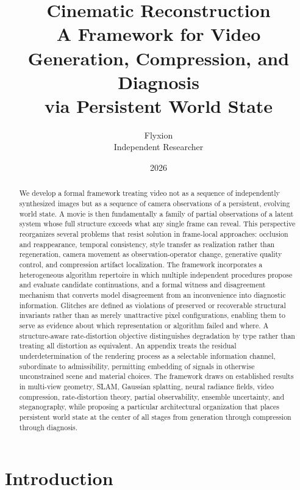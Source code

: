 \documentclass[11pt,a4paper]{article}
\title{\textbf{Cinematic Reconstruction}\\[4pt]
\large A Framework for Video Generation, Compression, and Diagnosis\\
via Persistent World State}
\author{Flyxion\\[2pt]
\small Independent Researcher}
\date{2026}
\theoremstyle{plain}
\theoremstyle{definition}
\theoremstyle{remark}
\begin{document}
\maketitle
\thispagestyle{empty}

\begin{abstract}
We develop a formal framework treating video not as a sequence of independently synthesized images but as a sequence of camera observations of a persistent, evolving world state. A movie is then fundamentally a family of partial observations of a latent system whose full structure exceeds what any single frame can reveal. This perspective reorganizes several problems that resist solution in frame-local approaches: occlusion and reappearance, temporal consistency, style transfer as realization rather than regeneration, camera movement as observation-operator change, generative quality control, and compression artifact localization. The framework incorporates a heterogeneous algorithm repertoire in which multiple independent procedures propose and evaluate candidate continuations, and a formal witness and disagreement mechanism that converts model disagreement from an inconvenience into diagnostic information. Glitches are defined as violations of preserved or recoverable structural invariants rather than as merely unattractive pixel configurations, enabling them to serve as evidence about which representation or algorithm failed and where. A structure-aware rate-distortion objective distinguishes degradation by type rather than treating all distortion as equivalent. An appendix treats the residual underdetermination of the rendering process as a selectable information channel, subordinate to admissibility, permitting embedding of signals in otherwise unconstrained scene and material choices. The framework draws on established results in multi-view geometry, SLAM, Gaussian splatting, neural radiance fields, video compression, rate-distortion theory, partial observability, ensemble uncertainty, and steganography, while proposing a particular architectural organization that places persistent world state at the center of all stages from generation through compression through diagnosis.
\end{abstract}

\newpage
\tableofcontents
\newpage

\section{Introduction}
\end{document}
